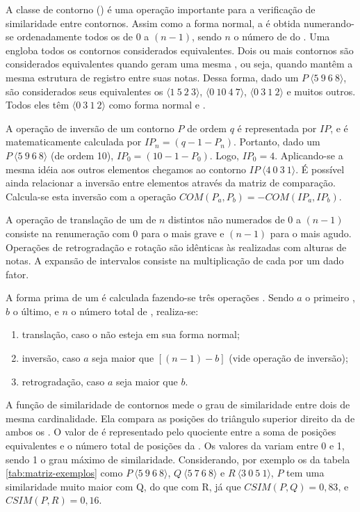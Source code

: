 A classe de contorno () é uma operação importante para a
verificação de similaridade entre contornos. Assim como a forma
normal, a  é obtida numerando-se ordenadamente todos os
 de $0$ a $(n-1)$, sendo $n$ o número de
 do . Uma  engloba todos os
contornos considerados equivalentes. Dois ou mais contornos são
considerados equivalentes quando geram uma mesma ,
ou seja, quando mantêm a mesma estrutura de registro entre suas
notas. Dessa forma, dado um 
$P\:\langle5\:9\:6\:8\rangle$, são considerados seus equivalentes os
 $\langle1\:5\:2\:3\rangle$, $\langle0\:10\:4\:7\rangle$,
$\langle0\:3\:1\:2\rangle$ e muitos outros. Todos eles têm
$\langle0\:3\:1\:2\rangle$ como forma normal e .

A operação de inversão de um contorno $P$ de ordem $q$ é representada
por $IP$, e é matematicamente calculada por
$IP_n=(q-1-P_n)$. Portanto, dado um 
$P\:\langle5\:9\:6\:8\rangle$ (de ordem 10), $IP_0=(10-1-P_0)$. Logo,
$IP_0=4$. Aplicando-se a mesma idéia aos outros elementos chegamos ao
contorno $IP\:\langle4\:0\:3\:1\rangle$. É possível ainda relacionar a
inversão entre elementos através da matriz de comparação. Calcula-se
esta inversão com a operação $COM(P_a,P_b)=-COM(IP_a,IP_b)$.

A operação de translação de um  de $n$ 
distintos não numerados de $0$ a $(n-1)$ consiste na renumeração com
$0$ para o  mais grave e $(n-1)$ para o mais
agudo. Operações de retrogradação e rotação são idênticas às
realizadas com alturas de notas. A expansão de intervalos consiste na
multiplicação de cada  por um dado fator.

A forma prima de um  é calculada fazendo-se três operações
\cite{marvin.ea87:relating}. Sendo $a$ o primeiro , $b$
o último, e $n$ o número total de , realiza-se:
\begin{enumerate}
\item translação, caso o  não esteja em sua forma normal;
\item inversão, caso $a$ seja maior que $[(n-1) - b]$ (vide operação
  de inversão);
\item retrogradação, caso $a$ seja maior que $b$.
\end{enumerate}

A função de similaridade de contornos  mede o grau de
similaridade entre dois  de mesma cardinalidade. Ela
compara as posições do triângulo superior direito da
 de ambos os . O valor de  é
representado pelo quociente entre a soma de posições equivalentes e o
número total de posições da . Os valores da
 variam entre 0 e 1, sendo 1 o grau máximo de
similaridade. Considerando, por exemplo os  da tabela
\ref{tab:matriz-exemplos} como $P\:\langle5\:9\:6\:8\rangle$,
$Q\:\langle5\:7\:6\:8\rangle$ e $R\:\langle3\:0\:5\:1\rangle$, $P$ tem
uma similaridade muito maior com Q, do que com R, já que
$CSIM(P,Q)=0,83$, e $CSIM(P,R)=0,16$.

